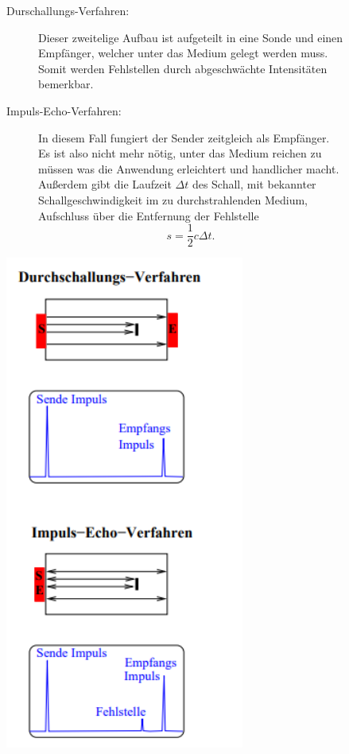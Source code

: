 \begin{figure}
\begin{minipage}{0.5\textwidth}
\begin{description}
    \item [Durschallungs-Verfahren:] Dieser zweitelige Aufbau ist aufgeteilt in eine Sonde und einen Empfänger, welcher unter das Medium gelegt werden muss.
    Somit werden Fehlstellen durch abgeschwächte Intensitäten bemerkbar. \\
    \item [Impuls-Echo-Verfahren:] In diesem Fall fungiert der Sender zeitgleich als Empfänger. Es ist also nicht mehr nötig, unter das Medium reichen zu müssen was die Anwendung 
    erleichtert und handlicher macht. Außerdem gibt die Laufzeit $\Delta t$ des Schall, mit bekannter Schallgeschwindigkeit im zu durchstrahlenden Medium, 
    Aufschluss über die Entfernung der Fehlstelle
    \begin{equation}
        \label{eqn:WegvonSchallDurchEinMediumMitSchallgeschwindkeitCUndLaufzeitDeltaTWoebiDasBestimmtAuchAlsLichgeschwindgeitGesehenwerdenkannwennmankeineahnunghatundnichtdenkontextcheckt.}
        s = \frac{1}{2}c \Delta t.
    \end{equation}
\end{description}
\end{minipage}
\hfill
\begin{minipage}{0.4\textwidth}
    \centering
    \includegraphics[width=0.7\textwidth]{Bilder/stuff.png}

\end{minipage}
\end{figure}
